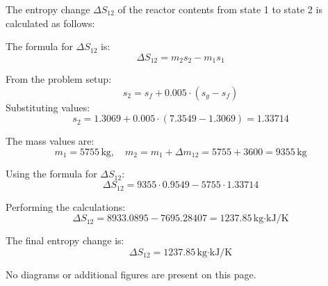The entropy change \( \Delta S_{12} \) of the reactor contents from state 1 to state 2 is calculated as follows:

The formula for \( \Delta S_{12} \) is:  
\[
\Delta S_{12} = m_2 s_2 - m_1 s_1
\]

From the problem setup:  
\[
s_2 = s_f + 0.005 \cdot (s_g - s_f)
\]
Substituting values:  
\[
s_2 = 1.3069 + 0.005 \cdot (7.3549 - 1.3069) = 1.33714
\]

The mass values are:  
\[
m_1 = 5755 \, \text{kg}, \quad m_2 = m_1 + \Delta m_{12} = 5755 + 3600 = 9355 \, \text{kg}
\]

Using the formula for \( \Delta S_{12} \):  
\[
\Delta S_{12} = 9355 \cdot 0.9549 - 5755 \cdot 1.33714
\]

Performing the calculations:  
\[
\Delta S_{12} = 8933.0895 - 7695.28407 = 1237.85 \, \text{kg·kJ/K}
\]  

The final entropy change is:  
\[
\Delta S_{12} = 1237.85 \, \text{kg·kJ/K}
\]  

No diagrams or additional figures are present on this page.